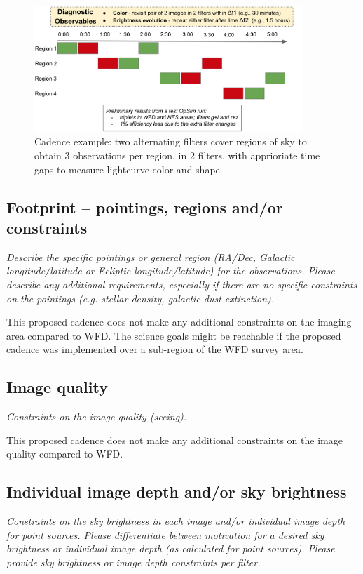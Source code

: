 \documentclass[12pt, letterpaper]{article}
\begin{document}
\begin{figure}[!h]
\includegraphics[width=0.9\textwidth]{figures/highLevelCadence.png}
\caption{Cadence example: two alternating filters cover regions of sky to obtain 3 observations per region, in 2 filters, with apprioriate time gaps to measure lightcurve color and shape.}
\end{figure}

\subsection{Footprint -- pointings, regions and/or constraints}
\begin{footnotesize}{\it Describe the specific pointings or general region (RA/Dec, Galactic longitude/latitude or Ecliptic longitude/latitude) for the observations. Please describe any additional requirements, especially if there are no specific constraints on the pointings (e.g. stellar density, galactic dust extinction).}
\end{footnotesize}

This proposed cadence does not make any additional constraints on the imaging area compared to WFD. The science goals might be reachable if the proposed cadence was implemented over a sub-region of the WFD survey area.  

\subsection{Image quality}
\begin{footnotesize}{\it Constraints on the image quality (seeing).}\end{footnotesize}

This proposed cadence does not make any additional constraints on the image quality compared to WFD. 

\subsection{Individual image depth and/or sky brightness}
\begin{footnotesize}{\it Constraints on the sky brightness in each image and/or individual image depth for point sources. Please differentiate between motivation for a desired sky brightness or individual image depth (as calculated for point sources). Please provide sky brightness or image depth constraints per filter.}
\end{footnotesize}
\end{document}
